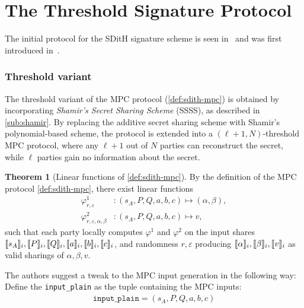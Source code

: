 \documentclass[11pt]{report}
\theoremstyle{definition}
\newtheorem{theorem}{Theorem}[section]
\theoremstyle{plain}
\begin{document}
\section{The Threshold Signature Protocol}\label{sec:sdith-signature}

The initial protocol for the SDitH signature scheme is seen in~\cite[Figure 1]{aguilarsyndrome11} and was first introduced in~\cite[Figure 1, p19]{feneuil2022syndrome}.

\subsubsection{Threshold variant}\label{sub:sdith-threshold-sss}

The threshold variant of the MPC protocol (\autoref{def:sdith-mpc}) is obtained by incorporating \textit{Shamir's Secret Sharing Scheme} (SSSS), as described in \autoref{sub:shamir}. By replacing the additive secret sharing scheme with Shamir's polynomial-based scheme, the protocol is extended into a $(\ell+1, N)$-threshold MPC protocol, where any $\ell+1$ out of $N$ parties can reconstruct the secret, while $\ell$ parties gain no information about the secret.

\begin{theorem}[Linear functions of \autoref{def:sdith-mpc}]\label{thm:sdith-mpc-linear}
  By the definition of the MPC protocol \autoref{def:sdith-mpc}, there exist linear functions
  \begin{align}
    \varphi^1_{r,\varepsilon}                 & : (s_A, P, Q, a, b, c) \mapsto (\alpha, \beta), \\
    \varphi^2_{r, \varepsilon, \alpha, \beta} & : (s_A, P, Q, a, b, c) \mapsto v,
  \end{align}
  such that each party locally computes $\varphi^1$ and $\varphi^2$ on the input shares $\llbracket s_A \rrbracket_i, \llbracket P \rrbracket_i, \llbracket Q \rrbracket_i, \llbracket a \rrbracket_i, \llbracket b \rrbracket_i, \llbracket c \rrbracket_i$, and randomness $r, \varepsilon$ producing $\llbracket \alpha \rrbracket_i, \llbracket \beta \rrbracket_i, \llbracket v \rrbracket_i$ as valid sharings of $\alpha, \beta, v$.
\end{theorem}

The authors suggest a tweak to the MPC input generation in the following way: Define the \texttt{input\_plain} as the tuple containing the MPC inputs:
\begin{align*}
  \texttt{input\_plain} = (s_A, P, Q, a, b, c)
\end{align*}
\end{document}
